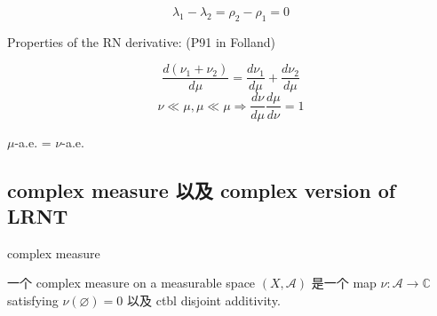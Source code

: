 \documentclass{qlnotes-export}
\begin{document}
\[\lambda_{1} - \lambda_{2} = \rho_{2} - \rho_{1} = 0\]

Properties of the RN derivative: (P91 in Folland)

\[\frac{d(\nu_{1} + \nu_{2})}{d\mu} = \frac{d\nu_{1}}{d\mu} + \frac{d\nu_{2}}{d\mu}\]\[\nu \ll \mu,\mu \ll \mu\Longrightarrow\frac{d\nu}{d\mu}\frac{d\mu}{d\nu} = 1\]

\(\mu\)-a.e. = \(\nu\)-a.e.

\subsection{complex measure 以及 complex version of LRNT}\label{complex-measure-ux4ee5ux53ca-complex-version-of-lrnt}

\begin{definition}{complex measure}\label{def-11-radon-nikodym-theorem-complex-measure}

一个 complex measure on a measurable space \((X,\mathcal{A})\) 是一个 map \(\nu:\mathcal{A}\rightarrow{\mathbb{C}}\) satisfying \(\nu(\varnothing) = 0\) 以及 ctbl disjoint additivity.

\end{definition}
\end{document}
